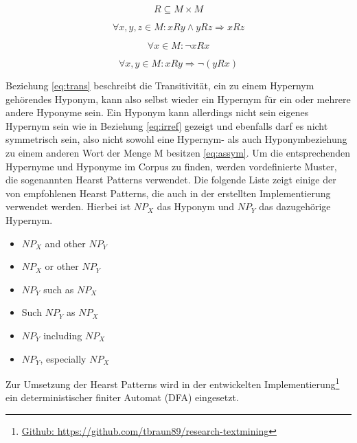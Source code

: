 \begin{equation}
  \label{eq:relation}
  R \subseteq M \times M
\end{equation}

\begin{equation}
  \label{eq:trans}
  \forall x, y, z \in M : xRy \land yRz \Rightarrow xRz
\end{equation}

\begin{equation}
  \label{eq:irref}
  \forall x \in M : \neg xRx
\end{equation}

\begin{equation}
  \label{eq:assym}
  \forall x, y \in M : xRy \Rightarrow \neg (yRx)
\end{equation}

Beziehung \ref{eq:trans} beschreibt die Transitivität, ein zu einem Hypernym gehörendes Hyponym, 
kann also selbst wieder ein Hypernym für ein oder mehrere andere Hyponyme sein.
Ein Hyponym kann allerdings nicht sein eigenes Hypernym sein wie in Beziehung \ref{eq:irref} gezeigt und ebenfalls darf es
nicht symmetrisch sein, also nicht sowohl eine Hypernym- als auch Hyponymbeziehung zu einem anderen Wort
der Menge M besitzen \ref{eq:assym}.
Um die entsprechenden Hypernyme und Hyponyme im Corpus zu finden, werden vordefinierte Muster, die sogenannten Hearst Patterns
verwendet. Die folgende Liste zeigt einige der von \cite{bib:Snow2004} empfohlenen Hearst Patterns, die auch in der erstellten
Implementierung verwendet werden. Hierbei ist $NP_{X}$ das Hyponym und $NP_{Y}$ das dazugehörige Hypernym.

\begin{itemize}
\item $NP_{X}$ and other $NP_{Y}$
\item $NP_{X}$ or other $NP_{Y}$
\item $NP_{Y}$ such as $NP_{X}$
\item Such $NP_{Y}$ as $NP_{X}$
\item $NP_{Y}$ including $NP_{X}$
\item $NP_{Y}$, especially $NP_{X}$
\end{itemize}

Zur Umsetzung der Hearst Patterns wird in der entwickelten Implementierung\footnote{\href{https://github.com/tbraun89/research-textmining}{Github:
 https://github.com/tbraun89/research-textmining}} ein deterministischer finiter Automat (DFA) eingesetzt. 
